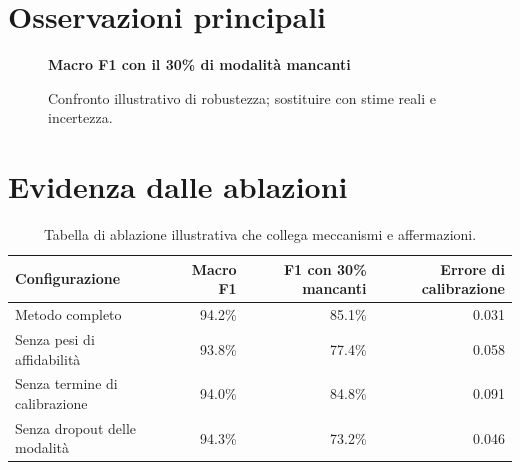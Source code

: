 \section{Osservazioni principali}
\begin{center}
\begin{minipage}{0.30\textwidth}\end{minipage}\hfill
\begin{minipage}{0.30\textwidth}\end{minipage}\hfill
\begin{minipage}{0.30\textwidth}\end{minipage}
\end{center}

\begin{figure}[htbp]
\centering
\begin{minipage}{0.84\textwidth}
{\sffamily\bfseries\color{ISISDeepBlue}Macro F1 con il 30\% di modalità mancanti\par\vspace{3mm}}
\end{minipage}
\caption{Confronto illustrativo di robustezza; sostituire con stime reali e incertezza.}
\label{fig:m-results}
\end{figure}

\section{Evidenza dalle ablazioni}
\begin{table}[htbp]
\centering
\caption{Tabella di ablazione illustrativa che collega meccanismi e affermazioni.}
\label{tab:m-ablation}
\begin{tabularx}{0.88\textwidth}{Yrrr}
\toprule
Configurazione & Macro F1 & F1 con 30\% mancanti & Errore di calibrazione\\
\midrule
Metodo completo & 94.2\% & 85.1\% & 0.031\\
Senza pesi di affidabilità & 93.8\% & 77.4\% & 0.058\\
Senza termine di calibrazione & 94.0\% & 84.8\% & 0.091\\
Senza dropout delle modalità & 94.3\% & 73.2\% & 0.046\\
\bottomrule
\end{tabularx}
\end{table}

